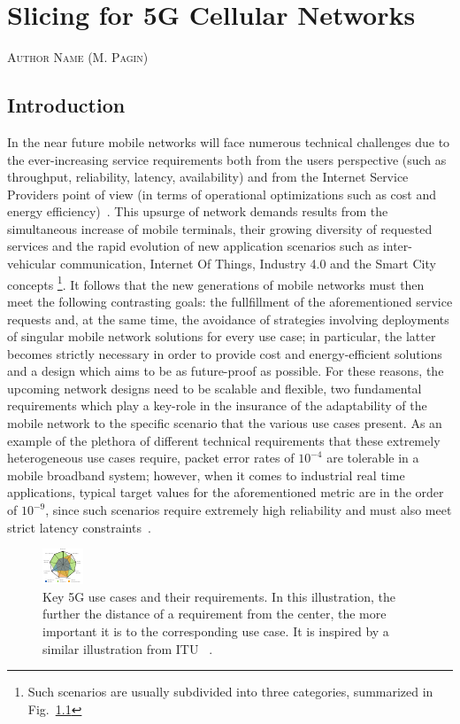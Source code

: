\documentclass[11pt]{book}
\makeatletter
\newcommand{\chapterauthor}[1]{%
  {\parindent0pt\vspace*{-25pt}%
  \linespread{1.1} \scshape#1%
  \par\nobreak\vspace*{35pt}}
  \@afterheading%
}
\makeatother
\begin{document}
\chapter{Slicing for 5G Cellular Networks}
\chapterauthor{Author Name (M. Pagin)}

\tableofcontents

\section{Introduction}

In the near future mobile networks will face numerous technical challenges due to the ever-increasing service requirements both from the users perspective (such as throughput, reliability, latency, availability) and from the Internet Service Providers point of view (in terms of operational optimizations such as cost and energy efficiency)~\cite{rost2017network}. This upsurge of network demands results from the simultaneous increase of mobile terminals, their growing diversity of requested services and the rapid evolution of new application scenarios such as inter-vehicular communication, Internet Of Things, Industry 4.0 and the Smart City concepts \footnote{Such scenarios are usually subdivided into three categories, summarized in Fig.~\ref{Fig:5g-req}}. It follows that the new generations of mobile networks must then meet the following contrasting goals: the fullfillment of the aforementioned service requests and, at the same time, the avoidance of strategies involving deployments of singular mobile network solutions for every use case; in particular, the latter becomes strictly necessary in order to provide cost and energy-efficient solutions and a design which aims to be as future-proof as possible. For these reasons, the upcoming network designs need to be scalable and flexible, two fundamental requirements which play a key-role in the insurance of the adaptability of the mobile network to the specific scenario that the various use cases present. As an example of the plethora of different technical requirements that these extremely heterogeneous use cases require, packet error rates of $10^{-4}$ are tolerable in a mobile broadband system; however, when it comes to industrial real time applications, typical target values for the aforementioned metric are in the order of $10^{-9}$, since such scenarios require extremely high reliability and must also meet strict latency constraints~\cite{frotzscher2014requirements, parvez2018survey}.
\begin{figure}[!ht]
    \centering
    \includegraphics[scale=11]{figures/5g-req.pdf}
     \setlength\belowcaptionskip{.1cm}
  \caption{Key 5G use cases and their requirements. In this illustration, the further the distance of a requirement from the center, the more important it is to the corresponding use case. It is inspired by a similar illustration from ITU ~\cite{ITU}.}
    \label{Fig:5g-req}
\end{figure}
\end{document}
